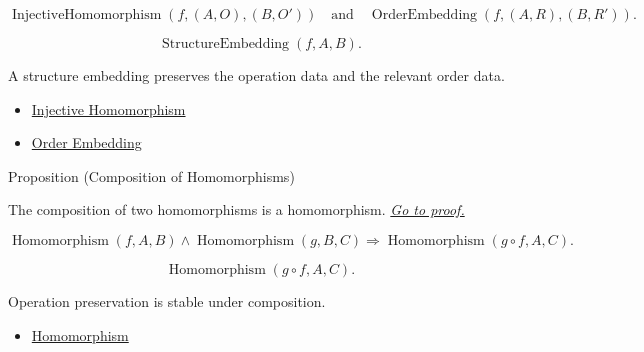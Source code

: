 \begin{remark*}
\[
\operatorname{InjectiveHomomorphism}(f,(A,O),(B,O'))
\quad\text{and}\quad
\operatorname{OrderEmbedding}(f,(A,R),(B,R')).
\]
\end{remark*}

\begin{remark*}
\[
\operatorname{StructureEmbedding}(f,A,B).
\]
\end{remark*}

\begin{remark*}[Interpretation]
A structure embedding preserves the operation data and the relevant order data.
\end{remark*}

\begin{dependencies}
\begin{itemize}
  \item \hyperref[def:injective-homomorphism]{Injective Homomorphism}
  \item \hyperref[def:abstract-order-embedding]{Order Embedding}
\end{itemize}
\end{dependencies}

\begin{propositionbox}{Proposition (Composition of Homomorphisms)}
\begin{proposition}
\label{prop:composition-of-homomorphisms}
The composition of two homomorphisms is a homomorphism.
\hyperref[prf:composition-of-homomorphisms]{\textit{Go to proof.}}
\end{proposition}
\end{propositionbox}

\begin{remark*}
\[
\operatorname{Homomorphism}(f,A,B)
\land
\operatorname{Homomorphism}(g,B,C)
\Longrightarrow
\operatorname{Homomorphism}(g\circ f,A,C).
\]
\end{remark*}

\begin{remark*}
\[
\operatorname{Homomorphism}(g\circ f,A,C).
\]
\end{remark*}

\begin{remark*}[Interpretation]
Operation preservation is stable under composition.
\end{remark*}

\begin{dependencies}
\begin{itemize}
  \item \hyperref[def:homomorphism]{Homomorphism}
\end{itemize}
\end{dependencies}

